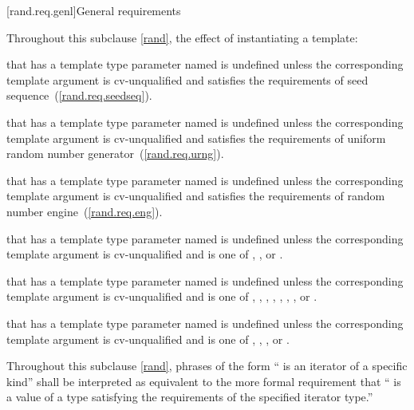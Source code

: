 [rand.req.genl]{General requirements}%

\pnum
Throughout this subclause \ref{rand},
the effect of instantiating a template:
\begin{enumeratea}
  \item
    that has a template type parameter
    named 
    is undefined unless the corresponding template argument
    is cv-unqualified and
    satisfies the requirements
    of seed sequence~(\ref{rand.req.seedseq}).
  \item
    that has a template type parameter
    named 
    is undefined unless the corresponding template argument
    is cv-unqualified and
    satisfies the requirements
    of uniform random number generator~(\ref{rand.req.urng}).
  \item
    that has a template type parameter
    named 
    is undefined unless the corresponding template argument
    is cv-unqualified and
    satisfies the requirements
    of random number engine~(\ref{rand.req.eng}).
  \item
    that has a template type parameter
    named 
    is undefined unless the corresponding template argument
    is cv-unqualified and
    is one of
    , , or  .
  \item
    that has a template type parameter
    named 
    is undefined unless the corresponding template argument
    is cv-unqualified and
    is one of
      ,
      ,
      ,
       ,
       ,
       ,
       ,
      or
        .
  \item
    that has a template type parameter
    named 
    is undefined unless the corresponding template argument
    is cv-unqualified and
    is one of
       ,
       ,
       ,
      or
        .
\end{enumeratea}

\pnum
Throughout this subclause \ref{rand},
phrases of the form `` is an iterator of a specific kind''
shall be interpreted as equivalent to the more formal requirement that
`` is a value
of a type satisfying the requirements
of the specified iterator type.''


